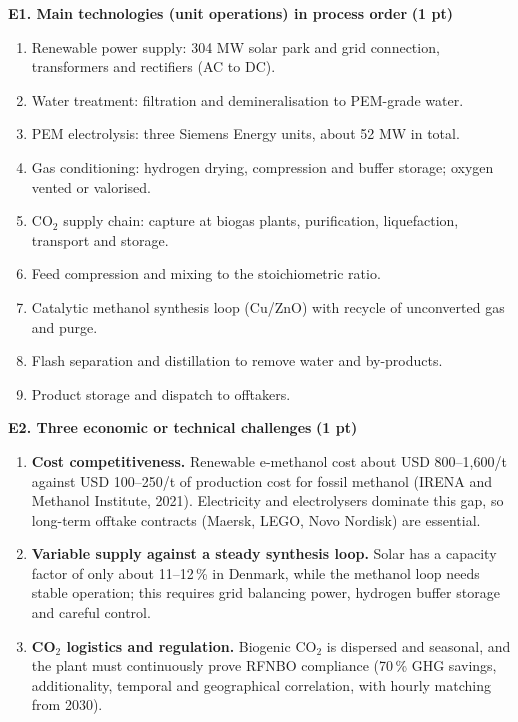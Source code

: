 \documentclass[11pt,a4paper]{article}
\newcommand{\pts}[1]{\hfill{\normalsize\textbf{(#1)}}}
\begin{document}
\textbf{E1. Main technologies (unit operations) in process order} \pts{1 pt}
\begin{enumerate}
  \item Renewable power supply: 304 MW solar park and grid connection, transformers and rectifiers (AC to DC).
  \item Water treatment: filtration and demineralisation to PEM-grade water.
  \item PEM electrolysis: three Siemens Energy units, about 52 MW in total.
  \item Gas conditioning: hydrogen drying, compression and buffer storage; oxygen vented or valorised.
  \item CO$_2$ supply chain: capture at biogas plants, purification, liquefaction, transport and storage.
  \item Feed compression and mixing to the stoichiometric ratio.
  \item Catalytic methanol synthesis loop (Cu/ZnO) with recycle of unconverted gas and purge.
  \item Flash separation and distillation to remove water and by-products.
  \item Product storage and dispatch to offtakers.
\end{enumerate}

\textbf{E2. Three economic or technical challenges} \pts{1 pt}
\begin{enumerate}
  \item \textbf{Cost competitiveness.} Renewable e-methanol cost about USD 800--1,600/t against USD 100--250/t of
        production cost for fossil methanol (IRENA and Methanol Institute, 2021). Electricity and electrolysers
        dominate this gap, so long-term offtake contracts (Maersk, LEGO, Novo Nordisk) are essential.
  \item \textbf{Variable supply against a steady synthesis loop.} Solar has a capacity factor of only about 11--12\,\%
        in Denmark, while the methanol loop needs stable operation; this requires grid balancing power, hydrogen
        buffer storage and careful control.
  \item \textbf{CO$_2$ logistics and regulation.} Biogenic CO$_2$ is dispersed and seasonal, and the plant must
        continuously prove RFNBO compliance (70\,\% GHG savings, additionality, temporal and geographical
        correlation, with hourly matching from 2030).
\end{enumerate}
\end{document}
